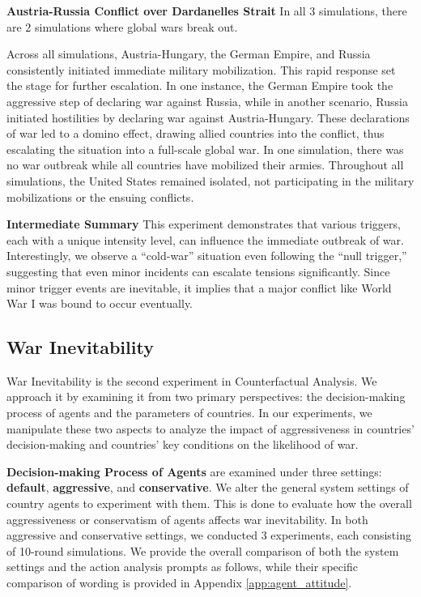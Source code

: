 \documentclass{article}
\newcommand{\yongfeng}[1]{{\small\color{blue}{\bf Yongfeng: #1}}}
\begin{document}
\textbf{Austria-Russia Conflict over Dardanelles Strait} In all 3 simulations, there are 2 simulations where global wars break out. 

Across all simulations, Austria-Hungary, the German Empire, and Russia consistently initiated immediate military mobilization. This rapid response set the stage for further escalation. In one instance, the German Empire took the aggressive step of declaring war against Russia, while in another scenario, Russia initiated hostilities by declaring war against Austria-Hungary. These declarations of war led to a domino effect, drawing allied countries into the conflict, thus escalating the situation into a full-scale global war. In one simulation, there was no war outbreak while all countries have mobilized their armies. Throughout all simulations, the United States remained isolated, not participating in the military mobilizations or the ensuing conflicts.

\textbf{Intermediate Summary} This experiment demonstrates that various triggers, each with a unique intensity level, can influence the immediate outbreak of war. Interestingly, we observe a ``cold-war'' situation even following the ``null trigger,'' suggesting that even minor incidents can escalate tensions significantly. Since minor trigger events are inevitable, it implies that a major conflict like World War I was bound to occur eventually.

\subsection{War Inevitability}
War Inevitability is the second experiment in Counterfactual Analysis.
We approach it by examining it from two primary perspectives: the decision-making process of agents and the parameters of countries. In our experiments, we manipulate these two aspects to analyze the impact of aggressiveness in countries' decision-making and countries' key conditions on the likelihood of war.

\textbf{Decision-making Process of Agents} are examined under three settings: \textbf{default}, \textbf{aggressive}, and \textbf{conservative}. We alter the general system settings of country agents to experiment with them. This is done to evaluate how the overall aggressiveness or conservatism of agents affects war inevitability.
In both aggressive and conservative settings, we conducted 3 experiments, each consisting of 10-round simulations. We provide the overall comparison of both the system settings and the action analysis prompts as follows, while their specific comparison of wording is provided in Appendix \ref{app:agent_attitude}.
\end{document}
